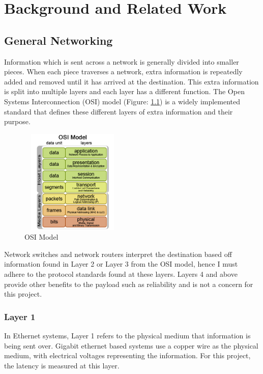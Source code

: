 \chapter{Background and Related Work}\label{C:back}

\section{General Networking}

Information which is sent across a network is generally divided into smaller pieces. When each piece
traverses a network, extra information is repeatedly added and removed until it has arrived at the
destination. This extra information is split into multiple layers and each layer has a different function.
The Open Systems Interconnection (OSI) model (Figure: \ref{fig:OSIModel}) is a widely implemented standard that
defines these different layers of extra information and their purpose.

\begin{figure}[H]
    \begin{center}
        \includegraphics[width=5cm,height=5cm,keepaspectratio]{Images/OSIModel.png}
        \caption{OSI Model \cite{OSIPic}}
        \label{fig:OSIModel}
    \end{center}
\end{figure}

Network switches and network routers interpret the destination based off information found in
Layer 2 or Layer 3 from the OSI model, hence I must adhere to the protocol standards found at these
layers. Layers 4 and above provide other benefits to the payload such as reliability and is not a
concern for this project.

\subsection{Layer 1}

In Ethernet systems, Layer 1 refers to the physical medium that information is being sent over.
Gigabit ethernet based systems use a copper wire as the physical medium, with electrical voltages
representing the information. For this project, the latency is measured at this layer.

